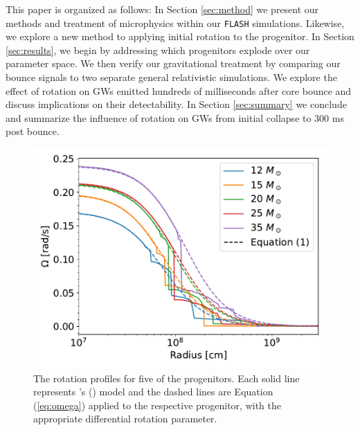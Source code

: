 \documentclass[twocolumn,times]{aastex62}  %
\begin{document}
This paper is organized as follows:  In Section \ref{sec:method} we present our methods and treatment of microphysics within our \texttt{FLASH} simulations.  Likewise, we explore a new method to applying initial rotation to the progenitor.  In Section \ref{sec:results}, we begin by addressing which progenitors explode over our parameter space.  We then verify our gravitational treatment by comparing our bounce signals to two separate general relativistic simulations.  We explore the effect of rotation on GWs emitted hundreds of milliseconds after core bounce and discuss implications on their detectability.  In Section \ref{sec:summary} we conclude and summarize the influence of rotation on GWs from initial collapse to 300 ms post bounce. 


\begin{figure}[t]
    \centering
    \includegraphics[scale=0.45]{figures/omega_vs_r.pdf}
    \caption{The rotation profiles for five of the \citet{heger:2005} progenitors.  Each solid line represents \citeauthor{heger:2005}'s (\citeyear{heger:2005}) model and the dashed lines are Equation (\ref{eq:omega}) applied to the respective progenitor, with the appropriate differential rotation parameter.  }
    \label{fig:ovsr}
\end{figure}
\end{document}
